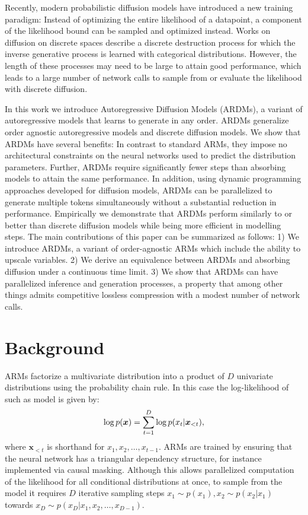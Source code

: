\documentclass{article} \usepackage{iclr2022_conference,times}
\def\vx{{\bm{x}}}
\begin{document}
Recently, modern probabilistic diffusion models have introduced a new training paradigm: Instead of optimizing the entire likelihood of a datapoint, a component of the likelihood bound can be sampled and optimized instead. Works on diffusion on discrete spaces \citep{sohldickstein2015diffusion,hoogeboom2021argmaxflows,austin2021structured} describe a discrete destruction process for which the inverse generative process is learned with categorical distributions. However, the length of these processes may need to be large to attain good performance, which leads to a large number of network calls to sample from or evaluate the likelihood with discrete diffusion.

In this work we introduce Autoregressive Diffusion Models (ARDMs), a variant of autoregressive models that learns to generate in any order. ARDMs generalize order agnostic autoregressive models and discrete diffusion models.  We show that ARDMs have several benefits: In contrast to standard ARMs, they impose no architectural constraints on the neural networks used to predict the distribution parameters. Further, ARDMs require significantly fewer steps than absorbing models to attain the same performance. In addition, using dynamic programming approaches developed for diffusion models, ARDMs can be parallelized to generate multiple tokens simultaneously without a substantial reduction in performance. Empirically we demonstrate that ARDMs perform similarly to or better than discrete diffusion models while being more efficient in modelling steps. The main contributions of this paper can be summarized as follows: 1) We introduce ARDMs, a variant of order-agnostic ARMs which include the ability to upscale variables. 2) We derive an equivalence between ARDMs and absorbing diffusion under a continuous time limit. 3) We show that ARDMs can have parallelized inference and generation processes, a property that among other things admits competitive lossless compression with a modest number of network calls.

 
\section{Background}
ARMs factorize a multivariate distribution into a product of $D$ univariate distributions using the probability chain rule. In this case the log-likelihood of such as model is given by:
\begin{equation}
\small
    \log p(\vx) = \sum_{t=1}^{D} \log p(x_t | \vx_{<t}),
\end{equation}
where $\vx_{<t}$ is shorthand for $x_1, x_2, \ldots, x_{t-1}$. ARMs are trained by ensuring that the neural network has a triangular dependency structure, for instance implemented via causal masking. Although this allows parallelized computation of the likelihood for all conditional distributions at once, to sample from the model it requires $D$ iterative sampling steps $x_1 \sim p(x_1), x_2 \sim p(x_2 | x_1)$ towards $x_D \sim p(x_D | x_1, x_2, \ldots, x_{D-1})$. 
\end{document}
